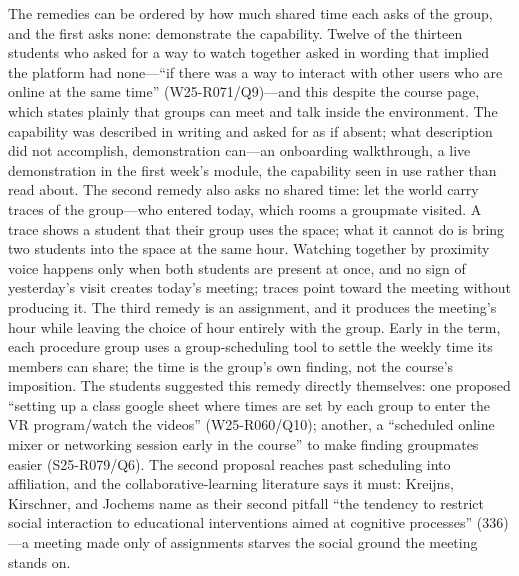 The remedies can be ordered by how much shared time each asks of the
group, and the first asks none: demonstrate the capability. Twelve of
the thirteen students who asked for a way to watch together asked in
wording that implied the platform had none---``if there was a way to
interact with other users who are online at the same time''
(W25-R071/Q9)---and this despite the course page, which states plainly
that groups can meet and talk inside the environment. The capability
was described in writing and asked for as if absent; what description
did not accomplish, demonstration can---an onboarding walkthrough, a
live demonstration in the first week's module, the capability seen in
use rather than read about. The second remedy also asks no shared
time: let the world carry traces of the group---who entered today,
which rooms a groupmate visited. A trace shows a student that their
group uses the space; what it cannot do is bring two students into the
space at the same hour. Watching together by proximity voice happens
only when both students are present at once, and no sign of
yesterday's visit creates today's meeting; traces point toward the
meeting without producing it. The third remedy is an assignment, and
it produces the meeting's hour while leaving the choice of hour
entirely with the group. Early in the term, each procedure group uses
a group-scheduling tool to settle the weekly time its members can
share; the time is the group's own finding, not the course's
imposition. The students suggested this remedy directly themselves:
one proposed ``setting up a class google sheet where times are set by
each group to enter the VR program/watch the videos'' (W25-R060/Q10);
another, a ``scheduled online mixer or networking session early in the
course'' to make finding groupmates easier (S25-R079/Q6). The second
proposal reaches past scheduling into affiliation, and the
collaborative-learning literature says it must: Kreijns, Kirschner,
and Jochems name as their second pitfall ``the tendency to restrict
social interaction to educational interventions aimed at cognitive
processes'' (336)---a meeting made only of assignments starves the
social ground the meeting stands on.

